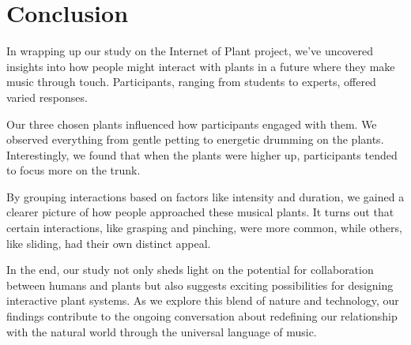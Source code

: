 \section{Conclusion}

In wrapping up our study on the Internet of Plant project, we've uncovered insights into how people might interact with plants in a future where they make music through touch. Participants, ranging from students to experts, offered varied responses.

Our three chosen plants influenced how participants engaged with them. We observed everything from gentle petting to energetic drumming on the plants. Interestingly, we found that when the plants were higher up, participants tended to focus more on the trunk.

By grouping interactions based on factors like intensity and duration, we gained a clearer picture of how people approached these musical plants. It turns out that certain interactions, like grasping and pinching, were more common, while others, like sliding, had their own distinct appeal.

In the end, our study not only sheds light on the potential for collaboration between humans and plants but also suggests exciting possibilities for designing interactive plant systems. As we explore this blend of nature and technology, our findings contribute to the ongoing conversation about redefining our relationship with the natural world through the universal language of music.